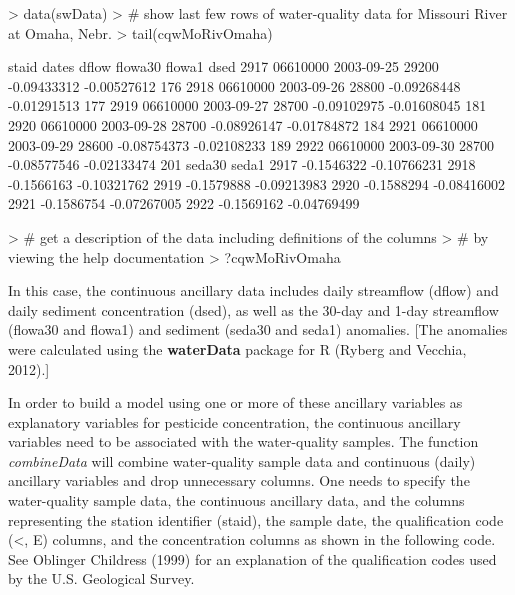 \documentclass[11pt]{article}
\begin{document}
\begin{Schunk}
\begin{Sinput}
> data(swData)
> # show last few rows of water-quality data for Missouri River at Omaha, Nebr.
> tail(cqwMoRivOmaha)
\end{Sinput}
\begin{Soutput}
        staid      dates dflow     flowa30      flowa1 dsed
2917 06610000 2003-09-25 29200 -0.09433312 -0.00527612  176
2918 06610000 2003-09-26 28800 -0.09268448 -0.01291513  177
2919 06610000 2003-09-27 28700 -0.09102975 -0.01608045  181
2920 06610000 2003-09-28 28700 -0.08926147 -0.01784872  184
2921 06610000 2003-09-29 28600 -0.08754373 -0.02108233  189
2922 06610000 2003-09-30 28700 -0.08577546 -0.02133474  201
         seda30       seda1
2917 -0.1546322 -0.10766231
2918 -0.1566163 -0.10321762
2919 -0.1579888 -0.09213983
2920 -0.1588294 -0.08416002
2921 -0.1586754 -0.07267005
2922 -0.1569162 -0.04769499
\end{Soutput}
\begin{Sinput}
> # get a description of the data including definitions of the columns
> # by viewing the help documentation
> ?cqwMoRivOmaha
\end{Sinput}
\end{Schunk}
\vspace{5 mm}

In this case, the continuous ancillary data includes daily streamflow (dflow) and daily sediment concentration (dsed), as well as the 30-day and 1-day streamflow (flowa30 and flowa1) and sediment (seda30 and seda1) anomalies.  [The anomalies were calculated using the \textbf{waterData} package for R (Ryberg and Vecchia, 2012).]

In order to build a model using one or more of these ancillary variables as explanatory variables for pesticide concentration, the continuous ancillary variables need to be associated with the water-quality samples.  The function \textit{combineData} will combine water-quality sample data and continuous (daily) ancillary variables and drop unnecessary columns.  One needs to specify the water-quality sample data, the continuous ancillary data, and the columns representing the station identifier (staid), the sample date, the qualification code (<, E) columns, and the concentration columns as shown in the following code.  See Oblinger Childress (1999) for an explanation of the qualification codes used by the U.S. Geological Survey.
\vspace{5 mm}
\end{document}
